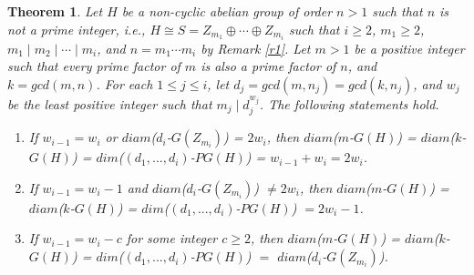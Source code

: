 \documentclass{amsart}
\newtheorem{thm}{Theorem}[section]
\theoremstyle{plain}
\begin{document}
			\begin{thm}\label{NCDIM}
			Let $H$ be a non-cyclic abelian group of order $n >1$ such that $n$ is not a prime integer, i.e., $H \cong S = Z_{m_1} \oplus \cdots \oplus Z_{m_i}$ such that $i \geq 2$, $m_1 \geq 2$, $m_1 \mid m_2 \mid \cdots \mid m_i$, and $n = m_1\cdots m_i$ by Remark \ref{r1}. Let $m > 1$ be a positive integer such that every prime factor of $m$ is also a prime factor of $n$, and $k = gcd(m, n)$. For each $1\leq j \leq i$, let $d_j = gcd(m, n_j) = gcd(k, n_j)$, and $w_j$ be the least positive integer such that $m_j \mid d_j^{w_j}$. The following statements hold.
			
			
			\begin{enumerate}
				
				\item If $w_{i-1} = w_i$ or $diam$($d_i$-$G(Z_{m_i})$) = $2w_i$, then $diam$($m$-$G(H)$) = $diam$($k$-$G(H)$) = $dim$($(d_1, ... , d_i)$-$PG(H)$) = $w_{i-1} + w_i = 2w_i$.
				\item If $w_{i-1} = w_i - 1$ and $diam$($d_i$-$G(Z_{m_i})$) $\not = 2w_i$, then  $diam$($m$-$G(H)$) = $diam$($k$-$G(H)$) = $dim$($(d_1, ... , d_i)$-$PG(H)$) $= 2w_i - 1$.
				\item If $w_{i-1} = w_i - c$ for some integer $c \geq 2$, then  $diam$($m$-$G(H)$) = $diam$($k$-$G(H)$) = $dim$($(d_1, ... , d_i)$-$PG(H)$) $=$ $diam$($d_i$-$G(Z_{m_i})$).
			\end{enumerate}
			\end{thm}
\end{document}

